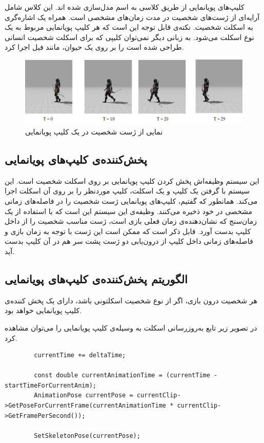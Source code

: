 کلیپ‌های پویانمایی از طریق کلاسی به اسم
مدل‌سازی شده اند. 
این کلاس شامل آرایه‌ای از ژست‌های شخصیت در مدت زمان‌های مشخصی است. همراه یک اشاره‌گری به اسکلت شخصیت.
نکته‌ی قابل توجه این است که هر کلیپ پویانمایی مربوط به یک نوع اسکلت می‌شود. به زبانی دیگر نمی‌توان کلیپی که برای اسکلت
شخصیت انسانی طراحی شده است را بر روی یک حیوان، مانند فیل اجرا کرد.

\begin{figure}[ht]
	\centerline{\includegraphics[width=\textwidth,height=\textheight,keepaspectratio]{Figures/Ch5/AnimationClip.png}}

	\caption{نمایی از ژست شخصیت در یک کلیپ پویانمایی}
	\label{fig:AnimationClip}
\end{figure}


\subsection{پخش‌کننده‌ی کلیپ‌های پویانمایی}

این سیستم وظیفه‌اش پخش کردن کلیپ پویانمایی بر روی اسکلت شخصیت است.
این سیستم با گرفتن یک کلیپ و یک اسکلت، کلیپ موردنظر را بر روی آن اسکلت اجرا می‌کند.
همانطور که گفتیم، کلیپ‌های پویانمایی ژست شخصیت را در فاصله‌های زمانی مشخصی در خود ذخیره ‌می‌کنند. وظیفه‌ی این سیستم این است که با استفاده از یک زمان‌سنج که نشان‌دهنده‌ی زمان فعلی بازی است، ژست مناسب شخصیت را از داخل کلیپ بدست آورد.
قابل ذکر است که ممکن است این ژست با توجه به زمان بازی و فاصله‌های زمانی داخل کلیپ
از درون‌یابی دو ژست پشت سر هم در آن کلیپ بدست آید.

\subsection{الگوریتم پخش‌کننده‌ی کلیپ‌های پویانمایی }

هر شخصیت درون بازی، اگر از نوع شخصیت اسکلتونی باشد، دارای یک پخش کننده‌ی کلیپ پویانمایی خواهد بود.

در تصویر زیر تابع به‌روزرسانی اسکلت به وسیله‌ی کلیپ پویانمایی را می‌توان مشاهده کرد.

\begin{latin}
	\begin{lstlisting}
		currentTime += deltaTime;

		const double currentAnimationTime = (currentTime - startTimeForCurrentAnim);
		AnimationPose currentPose = currentClip->GetPoseForCurrentFrame(currentAnimationTime * currentClip->GetFramePerSecond());
		
		SetSkeletonPose(currentPose);
	\end{lstlisting}
\end{latin}	




